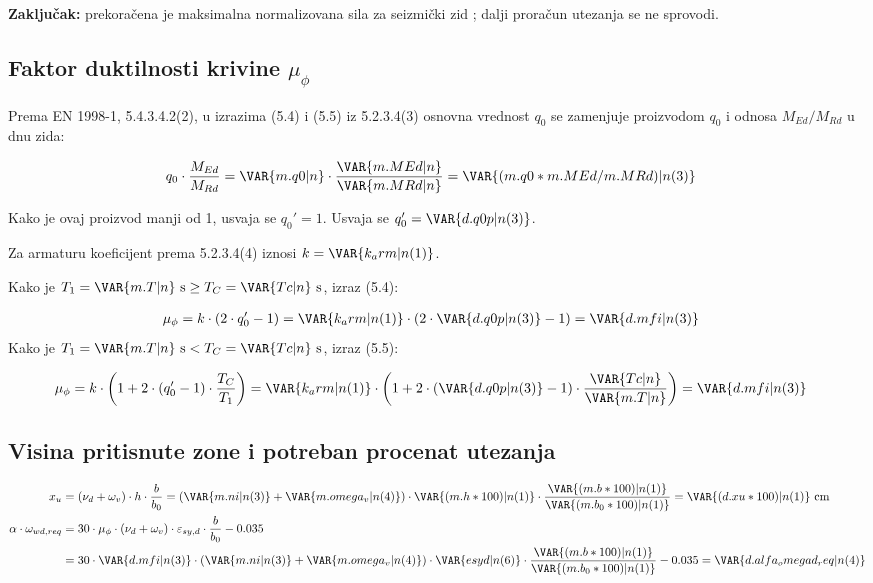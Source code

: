\textbf{Zaključak:} prekoračena je maksimalna normalizovana sila za seizmički zid ; dalji proračun utezanja se ne sprovodi.

\subsection{Faktor duktilnosti krivine $\mu_\phi$}

Prema EN 1998-1, 5.4.3.4.2(2), u izrazima (5.4) i (5.5) iz 5.2.3.4(3) osnovna vrednost $q_0$ se zamenjuje proizvodom $q_0$ i odnosa $M_{Ed}/M_{Rd}$ u dnu zida:

\begin{align*}
q_0 \cdot \frac{M_{Ed}}{M_{Rd}} &= \VAR{m.q0|n} \cdot \frac{\VAR{m.MEd|n}}{\VAR{m.MRd|n}} = \VAR{(m.q0*m.MEd/m.MRd)|n(3)}
\end{align*}

Kako je ovaj proizvod manji od 1, usvaja se $q_0' = 1$.
Usvaja se $q_0' = \VAR{d.q0p|n(3)}$.

Za armaturu  koeficijent prema 5.2.3.4(4) iznosi $k = \VAR{k_arm|n(1)}$.

Kako je $T_1 = \VAR{m.T|n} \ \mathrm{s} \geq T_C = \VAR{Tc|n} \ \mathrm{s}$, izraz (5.4):

\begin{align*}
\mu_\phi &= k \cdot (2 \cdot q_0' - 1) = \VAR{k_arm|n(1)} \cdot (2 \cdot \VAR{d.q0p|n(3)} - 1) = \VAR{d.mfi|n(3)}
\end{align*}
Kako je $T_1 = \VAR{m.T|n} \ \mathrm{s} < T_C = \VAR{Tc|n} \ \mathrm{s}$, izraz (5.5):

\begin{align*}
\mu_\phi &= k \cdot \left( 1 + 2 \cdot (q_0' - 1) \cdot \frac{T_C}{T_1} \right) = \VAR{k_arm|n(1)} \cdot \left( 1 + 2 \cdot (\VAR{d.q0p|n(3)} - 1) \cdot \frac{\VAR{Tc|n}}{\VAR{m.T|n}} \right) = \VAR{d.mfi|n(3)}
\end{align*}

\subsection{Visina pritisnute zone i potreban procenat utezanja}

\begin{align*}
x_u &= (\nu_d + \omega_v) \cdot h \cdot \frac{b}{b_0} = (\VAR{m.ni|n(3)} + \VAR{m.omega_v|n(4)}) \cdot \VAR{(m.h*100)|n(1)} \cdot \frac{\VAR{(m.b*100)|n(1)}}{\VAR{(m.b_0*100)|n(1)}} = \VAR{(d.xu*100)|n(1)} \ \mathrm{cm} \\
\alpha \cdot \omega_{wd,req} &= 30 \cdot \mu_\phi \cdot (\nu_d + \omega_v) \cdot \varepsilon_{sy,d} \cdot \frac{b}{b_0} - 0.035 \\
&= 30 \cdot \VAR{d.mfi|n(3)} \cdot (\VAR{m.ni|n(3)} + \VAR{m.omega_v|n(4)}) \cdot \VAR{esyd|n(6)} \cdot \frac{\VAR{(m.b*100)|n(1)}}{\VAR{(m.b_0*100)|n(1)}} - 0.035 = \VAR{d.alfa_omegad_req|n(4)}
\end{align*}

